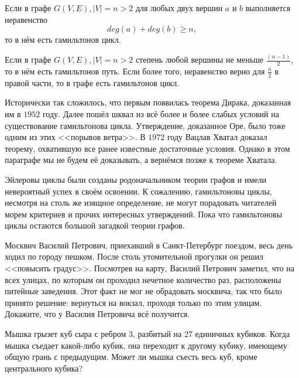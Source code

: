 \begin{consequence}
	Если в графе $G(V, E), |V| = n > 2$ для любых двух вершин $a$ и $b$ выполняется неравенство 
	$$deg (a) + deg (b) \geqslant n,$$
	то в нём есть гамильтонов цикл.
\end{consequence}

\begin{consequence}[Дирак]
	Если в графе $G(V, E), |V| = n > 2$ степень любой вершины не меньше $\frac{(n-1)}{2}$, то в нём есть гамильтонов путь. Если более того, неравенство верно для $\frac{n}{2}$ в правой части, то в графе есть гамильтонов цикл.
\end{consequence}

	Исторически так сложилось, что первым появилась теорема Дирака, доказанная им в $1952$ году. Далее пошёл шквал из всё более и более слабых условий на существование гамильтонова цикла. Утверждение, доказанное Оре, было тоже одним из этих <<порывов ветра>>. В $1972$ году Вацлав Хватал доказал теорему, охватившую все ранее известные достаточные условия. Однако в этом параграфе мы не будем её доказывать, а вернёмся позже к теореме Хватала.

	Эйлеровы циклы были созданы родоначальником теории графов и имели невероятный успех в своём освоении. К сожалению, гамильтоновы циклы, несмотря на столь же изящное определение, не могут порадовать читателей морем критериев и прочих интересных утверждений. Пока что гамильтоновы циклы остаются большой загадкой теории графов.


\begin{exersize}
	Москвич Василий Петрович, приехавший в Санкт-Петербург поездом, весь день ходил по городу пешком. После столь утомительной прогулки он решил <<повысить градус>>. Посмотрев на карту, Василий Петрович заметил, что на всех улицах, по которым он проходил нечетное количество раз, расположены питейные заведения. Этот факт не мог не обрадовать москвича, так что было принято решение: вернуться на вокзал, проходя только по этим улицам. Докажите, что у Василия Петровича всё получится.
\end{exersize}

\begin{exersize}
	Мышка грызет куб сыра с ребром 3, разбитый на 27 единичных кубиков. Когда мышка съедает какой-либо кубик, она переходит к другому кубику, имеющему общую грань с предыдущим. Может ли мышка съесть весь куб, кроме центрального кубика?
\end{exersize}


